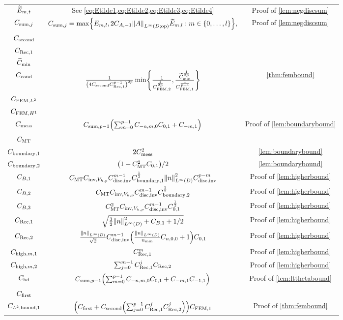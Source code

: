 \begin{tabular}{ccc}
  $\widetilde{E}_{m,t}$ & See \cref{eq:Etilde1,eq:Etilde2,eq:Etilde3,eq:Etilde4} & Proof of \cref{lem:negdiscsum}\\
  $C_{\mathrm{sum},j}$ &$\Csumj = \max\set{\Efn{m,l},2\CAmo\NLiDop{A}\Etildefn{m,l} \st m \in \set{0,\ldots,l}},$ & Proof of \cref{lem:negdiscsum}\\
  $C_{\mathrm{second}}$ &&\\
  $C_{\mathrm{Rec},1}$&&\\
  $\widetilde{C}_{\min}$&&\\
  $C_{\mathrm{cond}}$ & $\frac1{\mleft(4\Csecond \CReco^{p-1}\mright)^{2p}} \min\set{\frac1{\CFEMttilde^{\frac1{2p}}},\frac{\Ctildemin^{\frac1{2p}}}{\CFEMotilde^{\frac1{p+1}}}}$ & \cref{thm:fembound}\\
  $C_{\mathrm{FEM},L^{2}}$ &&\\
  $C_{\mathrm{FEM},H^{1}}$ &&\\
  $C_{\mathrm{mess}}$ &$\Csumpmo \mleft(\sum_{m=0}^{p-1} \Cfn{-n,m,0} \Cfn{0,1} + \Cfn{-m,1}\mright)$&Proof of \cref{lem:boundarybound}\\
  $C_{\mathrm{MT}}$ &&\\
  $C_{\mathrm{boundary},1}$ & $2C_{\mathrm{mess}}^2$ & \cref{lem:boundarybound} \\
  $C_{\mathrm{boundary},2}$ & $\mleft(1 + \CMT^2 \Cfn{0,1}\mright)/2$ & \cref{lem:boundarybound}\\
  $C_{B,1}$&$\CMT \CinvVhp \Chinv^{m-1} \Cboundaryo^{\half} \NLiD{n}^2\Chinv^{p-m}$&Proof of \cref{lem:higherbound}\\
  $C_{B,2}$&$C_{\mathrm{MT}} C_{\mathrm{inv},V_{h,p}} C_{\mathrm{disc},\mathrm{inv}}^{m-1} C_{\mathrm{boundary},2}^{\frac{1}{2}}$&Proof of \cref{lem:higherbound}\\
  $C_{B,3}$&$C_{\mathrm{MT}}^2 C_{\mathrm{inv},V_{h,p}} C_{\mathrm{disc},\mathrm{inv}}^{m-1}C_{0,1}^{\frac{1}{2}}$&Proof of \cref{lem:higherbound}\\
  $C_{\mathrm{Rec},1}$&$\sqrt{\frac32 \NLiD{n}^2 + \CBo + 1/2}$&Proof of \cref{lem:higherbound}\\
  $C_{\mathrm{Rec},2}$&$\frac{\NLiD{n}}{\sqrt{2}} \Chinv^{m-1} \mleft(\frac{\NLiD{n}}{\nmin} \Cfn{n,0,0} + 1\mright)\Cfn{0,1}$&Proof of \cref{lem:higherbound}\\
  $C_{\mathrm{high},m,1}$ & $C_{\mathrm{Rec},1}^m$&Proof of \cref{lem:higherbound}\\
  $C_{\mathrm{high},m,2}$ &$\sum_{j=0}^{m-1} C_{\mathrm{Rec},1}^j C_{\mathrm{Rec},2}$&Proof of \cref{lem:higherbound}\\
  $C_{\mathrm{bd}}$ &$\Csumfn{p-1}\mleft(\sum_{m=0}^{p-1} \Cfn{-n,m,0}\Cfn{0,1} + \Cfn{-m,1}\Cfn{-1,1}\mright)$&Proof of \cref{lem:ltthetabound}\\
  $C_{\mathrm{first}}$ &&\\
  $C_{L^{2},\mathrm{bound},1}$&$\mleft(\Cfirst+ \Csecond \mleft(\sum_{j=0}^{p-1} \CReco^j \CRect^j\mright)\mright) \CFEMotilde$&Proof of \cref{thm:fembound}\\

\end{tabular}

